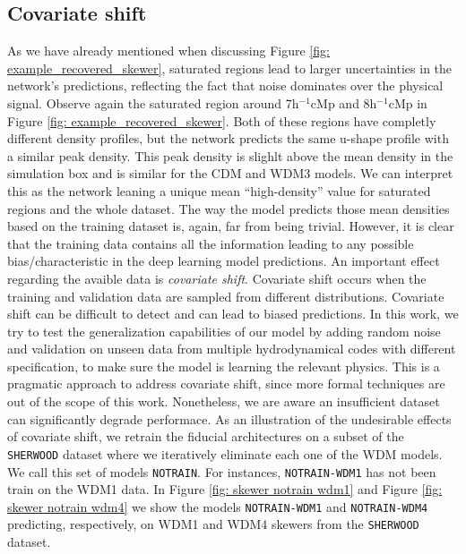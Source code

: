 \subsection{Covariate shift}
As we have already mentioned when discussing Figure \ref{fig: example_recovered_skewer}, saturated regions lead to larger uncertainties in the network's predictions, reflecting the fact that noise dominates over the physical signal. Observe again the saturated region around 7h$^{-1}$cMp and 8h$^{-1}$cMp in Figure \ref{fig: example_recovered_skewer}. Both of these regions have completly different density profiles, but the network predicts the same u-shape profile with a similar peak density. This peak density is slighlt above the mean density in the simulation box and is similar for the CDM and WDM3 models. We can interpret this as the network leaning a unique mean ``high-density'' value for saturated regions and the whole dataset.
The way the model predicts those mean densities based on the training dataset is, again, far from being trivial.
However, it is clear that the training data contains all the information leading to any possible bias/characteristic in the deep learning model predictions. An important effect regarding the avaible data is \emph{covariate shift}. Covariate shift occurs when the training and validation data are sampled from different distributions. Covariate shift can be difficult to detect and can lead to biased predictions. In this work, we try to test the generalization capabilities of our model by adding random noise and validation on unseen data from multiple hydrodynamical codes with different specification, to make sure the model is learning the relevant physics. This is a pragmatic approach to address covariate shift, since more formal techniques are out of the scope of this work. Nonetheless, we are aware an insufficient dataset can significantly degrade performace. As an illustration of the undesirable effects of covariate shift, we retrain the fiducial architectures on a subset of the \texttt{SHERWOOD} dataset where we iteratively eliminate each one of the WDM models. We call this set of models \texttt{NOTRAIN}. For instances, \texttt{NOTRAIN-WDM1} has not been train on the WDM1 data. In Figure \ref{fig: skewer notrain wdm1} and Figure \ref{fig: skewer notrain wdm4} we show the models \texttt{NOTRAIN-WDM1} and \texttt{NOTRAIN-WDM4} predicting, respectively, on WDM1 and WDM4 skewers from the \texttt{SHERWOOD} dataset.

